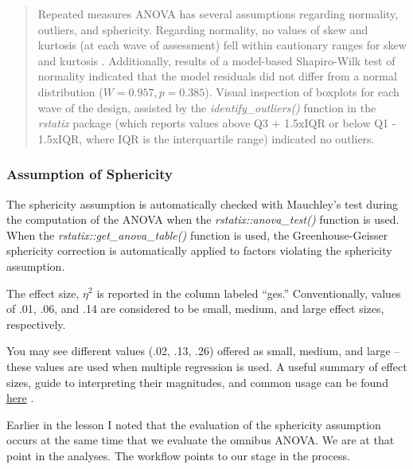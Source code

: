 \documentclass[
  11pt,
]{book}
\begin{document}
\begin{quote}
Repeated measures ANOVA has several assumptions regarding normality, outliers, and sphericity. Regarding normality, no values of skew and kurtosis (at each wave of assessment) fell within cautionary ranges for skew and kurtosis \citep{kline_data_2016}. Additionally, results of a model-based Shapiro-Wilk test of normality indicated that the model residuals did not differ from a normal distribution (\(W = 0.957, p = 0.385\)). Visual inspection of boxplots for each wave of the design, assisted by the \emph{identify\_outliers()} function in the \emph{rstatix} package (which reports values above Q3 + 1.5xIQR or below Q1 - 1.5xIQR, where IQR is the interquartile range) indicated no outliers.
\end{quote}

\hypertarget{assumption-of-sphericity}{%
\subsubsection{Assumption of Sphericity}\label{assumption-of-sphericity}}

The sphericity assumption is automatically checked with Mauchley's test during the computation of the ANOVA when the \emph{rstatix::anova\_test()} function is used. When the \emph{rstatix::get\_anova\_table()} function is used, the Greenhouse-Geisser sphericity correction is automatically applied to factors violating the sphericity assumption.

The effect size, \(\eta^2\) is reported in the column labeled ``ges.'' Conventionally, values of .01, .06, and .14 are considered to be small, medium, and large effect sizes, respectively.

You may see different values (.02, .13, .26) offered as small, medium, and large -- these values are used when multiple regression is used. A useful summary of effect sizes, guide to interpreting their magnitudes, and common usage can be found \href{https://imaging.mrc-cbu.cam.ac.uk/statswiki/FAQ/effectSize}{here} \citep{watson_rules_2020}.

Earlier in the lesson I noted that the evaluation of the sphericity assumption occurs at the same time that we evaluate the omnibus ANOVA. We are at that point in the analyses. The workflow points to our stage in the process.
\end{document}
